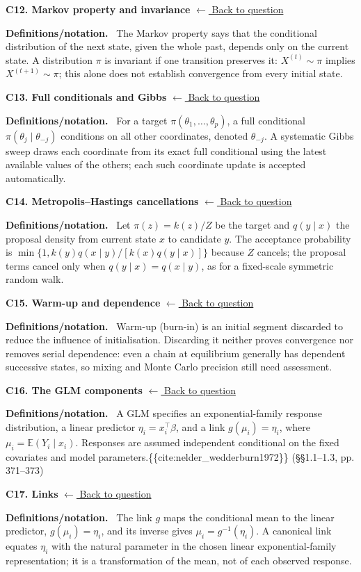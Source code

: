 \documentclass[11pt,a4paper]{article}
\newcommand{\E}{\mathbb{E}}
\newcommand{\concepttopic}[1]{%
  \par\addvspace{8pt}\noindent{\color{statblue}\bfseries #1}\par\nobreak\smallskip}
\newenvironment{conceptanswer}[2]
  {\par\addvspace{10pt}\noindent\begin{minipage}{\linewidth}%
   \hypertarget{concept-answer:#1}{}%
   \textcolor{statblue}{\textbf{C#1. #2}}\hfill%
   {\footnotesize\hyperlink{concept-question:#1}{$\leftarrow$ Back to question}}%
   \par\smallskip\textbf{Definitions/notation.}\ }
  {\end{minipage}\par}
\begin{document}
\begin{conceptanswer}{12}{Markov property and invariance}
The Markov property says that the conditional distribution of the next state,
given the whole past, depends only on the current state.
A distribution $\pi$ is invariant if one transition preserves it:
$X^{(t)}\sim\pi$ implies $X^{(t+1)}\sim\pi$; this alone does not establish
convergence from every initial state.
\end{conceptanswer}

\begin{conceptanswer}{13}{Full conditionals and Gibbs}
For a target $\pi(\theta_1,\ldots,\theta_p)$, a full conditional
$\pi(\theta_j\mid\theta_{-j})$ conditions on all other coordinates,
denoted $\theta_{-j}$.
A systematic Gibbs sweep draws each coordinate from its exact full
conditional using the latest available values of the others; each such
coordinate update is accepted automatically.
\end{conceptanswer}

\begin{conceptanswer}{14}{Metropolis--Hastings cancellations}
Let $\pi(z)=k(z)/Z$ be the target and $q(y\mid x)$ the proposal density
from current state $x$ to candidate $y$.
The acceptance probability is
$\min\{1,k(y)q(x\mid y)/[k(x)q(y\mid x)]\}$ because $Z$ cancels;
the proposal terms cancel only when $q(y\mid x)=q(x\mid y)$,
as for a fixed-scale symmetric random walk.
\end{conceptanswer}

\begin{conceptanswer}{15}{Warm-up and dependence}
Warm-up (burn-in) is an initial segment discarded to reduce the influence
of initialisation.
Discarding it neither proves convergence nor removes serial dependence:
even a chain at equilibrium generally has dependent successive states,
so mixing and Monte Carlo precision still need assessment.
\end{conceptanswer}

\concepttopic{GLM structure and fitting}
\begin{conceptanswer}{16}{The GLM components}
A GLM specifies an exponential-family response distribution, a linear
predictor $\eta_i=x_i^\top\beta$, and a link
$g(\mu_i)=\eta_i$, where $\mu_i=\E(Y_i\mid x_i)$.
Responses are assumed independent conditional on the fixed covariates
and model parameters.\{\{cite:nelder_wedderburn1972\}\} (§§1.1–1.3, pp. 371–373)
\end{conceptanswer}

\begin{conceptanswer}{17}{Links}
The link $g$ maps the conditional mean to the linear predictor,
$g(\mu_i)=\eta_i$, and its inverse gives $\mu_i=g^{-1}(\eta_i)$.
A canonical link equates $\eta_i$ with the natural parameter in the
chosen linear exponential-family representation; it is a transformation
of the mean, not of each observed response.
\end{conceptanswer}
\end{document}
